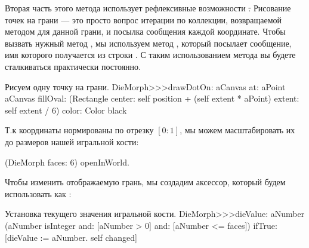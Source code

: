 \documentclass[a4paper,10pt,twoside]{book}
\begin{document}
Вторая часть этого метода использует рефлексивные возможности \st.
Рисование точек на грани --- это просто вопрос итерации по коллекции, возвращаемой методом  для данной грани, и посылка сообщения  каждой координате. Чтобы вызвать нужный метод , мы используем метод , который посылает сообщение, имя которого получается из строки . С таким использованием метода  вы будете сталкиваться практически постоянно.
\begin{method}{Рисуем одну точку на грани.}
DieMorph>>>drawDotOn: aCanvas at: aPoint
	aCanvas
		fillOval: (Rectangle
			center: self position + (self extent * aPoint)
			extent: self extent / 6)
		color: Color black
\end{method}

Т.к координаты нормированы по отрезку $[0{:}1]$, мы можем масштабировать их до размеров нашей игральной кости: 

\begin{code}{}
(DieMorph faces: 6) openInWorld.
\end{code}

Чтобы изменить отображаемую грань, мы создадим аксессор, который будем использовать как :
\begin{method}{Установка текущего значения игральной кости.}
DieMorph>>>dieValue: aNumber
	(aNumber isInteger
			and: [aNumber > 0]
			and: [aNumber <= faces])
		ifTrue:
			[dieValue := aNumber.
			self changed]
\end{method}
\end{document}
